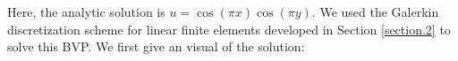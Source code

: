 	Here, the analytic solution is $u=\cos(\pi x)\cos(\pi y)$. We used the 
	Galerkin discretization scheme for linear finite elements developed in 
	Section	\ref{section.2} to solve this BVP. 
	We first give an visual of the solution:
	\begin{figure}[!htbp]
	\end{figure}\vspace{-30pt}

